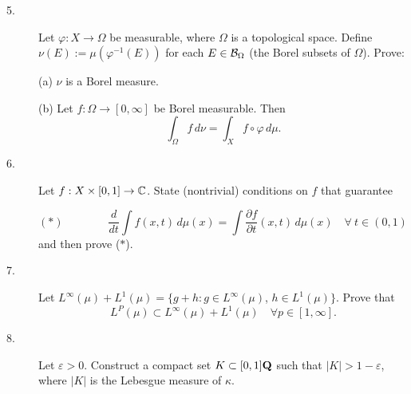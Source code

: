 \documentclass[bbb]{report}
\def\C{{\Bbb C}}
\begin{document}
\begin{Large}
\begin{description}
\vfill
\pagebreak

\item[5.]
Let $\varphi:X\to \Omega$ be measurable, where $\Omega$
is a topological space. Define $\nu(E):=\mu(\varphi^{-1}(E))$ for
each $E\in {\cal B}_{\Omega}$ (the Borel subsets of $\Omega$).
Prove:

\vspace{.1in}
\item[\quad] (a)
$\nu$ is a Borel measure.

\vspace{.25in}
\item[\quad] (b)
Let $f:\Omega\to[0,\infty]$ be Borel measurable. 
Then
$$ \int_\Omega f\,d\nu=\int_X f\circ \varphi\,d\mu. $$

\vspace{.5in}
\item[6.]
Let $f:X\times [0,1]\to\C$.
State (nontrivial) conditions on $f$ that \newline guarantee

$$
(\ast)\qquad\qquad \frac{d}{dt} \int f(x,t)\,d\mu(x)=\int
\frac{\partial f}{\partial t}(x,t)\,d\mu(x)
\quad \forall\ t\in(0,1)  \qquad\qquad{}
$$
and then prove ($\ast$).

\vspace{.25in}

\item[7.]
Let $L^\infty(\mu)+L^1(\mu)=\{g+h:g\in L^\infty(\mu)$,
$h\in L^1(\mu)\}$.
Prove that
$$
L^P(\mu)\subset L^\infty(\mu)+L^1(\mu)
\quad \forall p\in[1,\infty].
$$

\vspace{.25in}
\item[8.]
Let $\varepsilon>0$. Construct a compact set
$K\subset[0,1]{\bf Q}$
such that $|K|>1-\varepsilon$, where $|K|$ is
the Lebesgue measure of $\kappa$.


\vfill



\end{description}

\end{Large}
\end{document}
